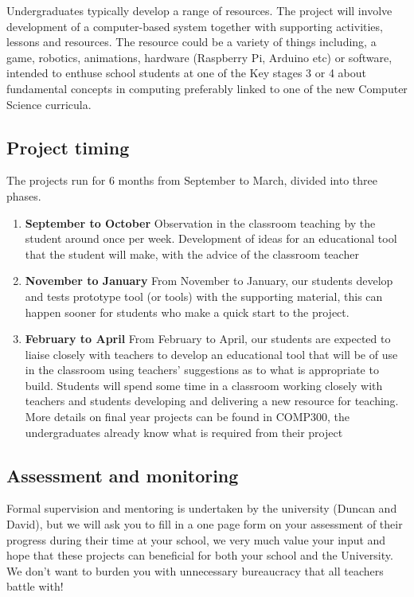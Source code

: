 \documentclass[
  12pt,
]{book}
\providecommand{\tightlist}{%
  \setlength{\itemsep}{0pt}\setlength{\parskip}{0pt}}
\begin{document}
Undergraduates typically develop a range of resources. The project will involve development of a computer-based system together with supporting activities, lessons and resources. The resource could be a variety of things including, a game, robotics, animations, hardware (Raspberry Pi, Arduino etc) or software, intended to enthuse school students at one of the Key stages 3 or 4 about fundamental concepts in computing preferably linked to one of the new Computer Science curricula.

\hypertarget{project-timing}{%
\subsection{Project timing}\label{project-timing}}

The projects run for 6 months from September to March, divided into three phases.

\begin{enumerate}
\def\labelenumi{\arabic{enumi}.}
\tightlist
\item
  \textbf{September to October} Observation in the classroom teaching by the student around once per week. Development of ideas for an educational tool that the student will make, with the advice of the classroom teacher
\item
  \textbf{November to January} From November to January, our students develop and tests prototype tool (or tools) with the supporting material, this can happen sooner for students who make a quick start to the project.
\item
  \textbf{February to April} From February to April, our students are expected to liaise closely with teachers to develop an educational tool that will be of use in the classroom using teachers' suggestions as to what is appropriate to build. Students will spend some time in a classroom working closely with teachers and students developing and delivering a new resource for teaching. More details on final year projects can be found in COMP300, the undergraduates already know what is required from their project
\end{enumerate}

\hypertarget{assessment-and-monitoring}{%
\subsection{Assessment and monitoring}\label{assessment-and-monitoring}}

Formal supervision and mentoring is undertaken by the university (Duncan and David), but we will ask you to fill in a one page form on your assessment of their progress during their time at your school, we very much value your input and hope that these projects can beneficial for both your school and the University. We don't want to burden you with unnecessary bureaucracy that all teachers battle with!
\end{document}
